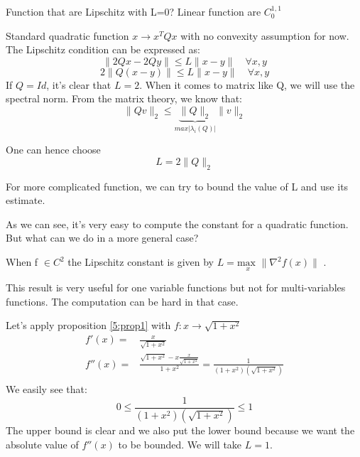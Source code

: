 \begin{example}\begin{leftbar}
Function that are Lipschitz with L=0? Linear function are $C_0^{1,1}$
\end{leftbar}\end{example}

\begin{example}\begin{leftbar}
Standard quadratic function $x \rightarrow x^T Q x $  with no convexity assumption for now. The Lipschitz condition can be expressed as: 
$$ \| 2Qx - 2Qy \| \leq L \| x-y \|  \quad \forall x,y$$
$$ 2 \| Q (x -y)  \| \leq L \| x-y \| \quad \forall x,y$$
If $Q=Id$, it's clear that $L = 2$.  When it comes to matrix like Q, we will use the spectral norm. From the matrix theory, we  know that:
$$ \| Qv \|_2 \leq \underbrace{\| Q\| _2}_{max \vert \lambda_i (Q) \vert} \| v \|_2$$

One can hence choose $$L=2 \| Q \|_2 $$

For more complicated function, we can try to bound the value of L  and use  its estimate. 
\end{leftbar}\end{example}

As we can see, it's very easy to compute the constant for a quadratic function. But what can we do in a more  general case?\\

\begin{property} 
When f  $ \in C^2$ the Lipschitz constant is given by $ L=\underset{x}{\text{max }} \| \nabla^2 f(x) \|$ .
\label{5:prop1}
\end{property}
This result is very useful for one variable functions but not for multi-variables functions. The computation can be hard in that case.

\begin{example}\begin{leftbar}
Let's apply proposition \ref{5:prop1} with $f: x \rightarrow \sqrt{1+x^2}$
\begin{eqnarray*}
f'(x)=& \frac{x}{\sqrt{1+x^2}}\\
f''(x)=& \frac{ \sqrt{1+x^2}-x \frac{x}{ \sqrt{1+x^2}}}{1+x^2}=\frac{1}{(1+x^2)(\sqrt{1+x^2})}\\
\end{eqnarray*}  
We easily see that:
$$ 0 \leq \frac{1}{(1+x^2)(\sqrt{1+x^2})} \leq 1$$
The upper bound is clear and we also put the lower bound because we want the absolute value of $f''(x)$ to be bounded. We  will take $L=1$.
\end{leftbar}\end{example}

